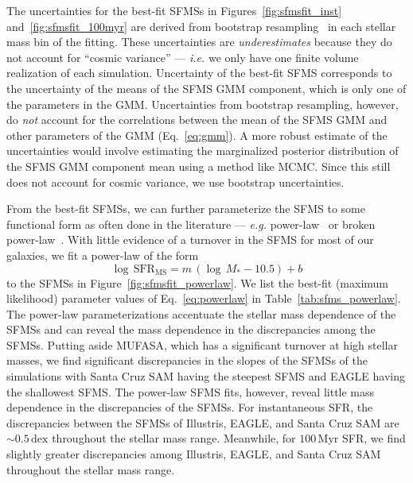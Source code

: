 \documentclass[preprint2,tighten]{aastex62}
\begin{document}
The uncertainties for the best-fit SFMSs in Figures~\ref{fig:sfmsfit_inst} and~\ref{fig:sfmsfit_100myr} 
are derived from bootstrap resampling~\citep{efron1979} in each stellar mass 
bin of the fitting. These uncertainties are \emph{underestimates} because 
they do not account for ``cosmic variance'' --- \emph{i.e.} we only have one 
finite volume realization of each simulation. Uncertainty of the best-fit 
SFMS corresponds to the uncertainty of the means of the SFMS GMM component, 
which is only one of the parameters in the GMM. Uncertainties from bootstrap 
resampling, however, do \emph{not} account for the correlations between the 
mean of the SFMS GMM and other
parameters of the GMM (Eq.~\ref{eq:gmm}). A more robust estimate of the 
uncertainties would involve estimating the marginalized posterior distribution 
of the SFMS GMM component mean using a method like MCMC. Since this still 
does not account for cosmic variance, we use bootstrap uncertainties. 

From the best-fit SFMSs, we can further 
parameterize the SFMS to some functional form as often done in the 
literature --- \emph{e.g.} power-law~\citep{speagle2014} or broken 
power-law~\citep{lee2015}. With little evidence of a turnover in the 
SFMS for most of our galaxies, we fit a power-law of the form 
\begin{equation} \label{eq:powerlaw}
\log\,\mathrm{SFR}_\mathrm{MS} = m\,(\log\,M_* - 10.5) + b
\end{equation}
to the SFMSs in Figure~\ref{fig:sfmsfit_powerlaw}. We list the best-fit 
(maximum likelihood) parameter values of Eq.~\ref{eq:powerlaw} in 
Table~\ref{tab:sfms_powerlaw}. The power-law parameterizations accentuate 
the stellar mass dependence of the SFMSs and can reveal the mass dependence 
in the discrepancies 
among the SFMSs. Putting aside MUFASA, which has a significant turnover at high 
stellar masses, we find significant discrepancies in the slopes of the SFMSs
of the simulations with Santa Cruz SAM having the steepest SFMS and EAGLE 
having the shallowest SFMS. The power-law SFMS fits, however, reveal little 
mass dependence in the discrepancies of the SFMSs. For instantaneous SFR, 
the discrepancies between the SFMSs of Illustris, EAGLE, and Santa Cruz SAM are 
$\sim 0.5\,\mathrm{dex}$ throughout the stellar mass range. Meanwhile, 
for $100\,\mathrm{Myr}$ SFR, we find slightly
greater discrepancies among Illustris, EAGLE, and Santa Cruz SAM throughout
the stellar mass range.
\end{document}
